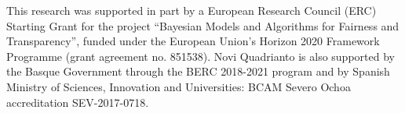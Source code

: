 This research was supported in part by a European Research Council (ERC) Starting Grant for the project ``Bayesian Models and Algorithms for Fairness and Transparency'',
funded under the European
Union's Horizon 2020 Framework Programme
(grant agreement no. 851538).
Novi Quadrianto is also supported by the Basque Government
through the BERC 2018-2021 program and by Spanish Ministry of Sciences, Innovation and Universities:
BCAM Severo Ochoa accreditation SEV-2017-0718.

